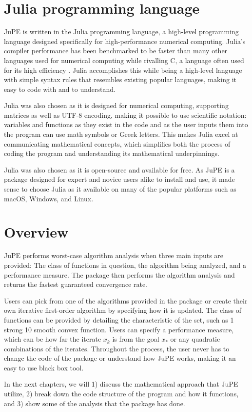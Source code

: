 \section{Julia programming language}

JuPE is written in the Julia programming language, a high-level programming language designed specifically for high-performance numerical computing. Julia's compiler performance has been benchmarked to be faster than many other languages used for numerical computing while rivalling C, a language often used for its high efficiency \cite{julia}. Julia accomplishes this while being a high-level language with simple syntax rules that resembles existing popular languages, making it easy to code with and to understand.

Julia was also chosen as it is designed for numerical computing, supporting matrices as well as UTF-8 encoding, making it possible to use scientific notation: variables and functions as they exist in the code and as the user inputs them into the program can use math symbols or Greek letters. This makes Julia excel at communicating mathematical concepts, which simplifies both the process of coding the program and understanding its mathematical underpinnings.

Julia was also chosen as it is open-source and available for free. As JuPE is a package designed for expert and novice users alike to install and use, it made sense to choose Julia as it available on many of the popular platforms such as macOS, Windows, and Linux.

\section{Overview}

JuPE performs worst-case algorithm analysis when three main inputs are provided: The class of functions in question, the algorithm being analyzed, and a performance measure. The package then performs the algorithm analysis and returns the fastest guaranteed convergence rate.

Users can pick from one of the algorithms provided in the package or create their own iterative first-order algorithm by specifying how it is updated. The class of functions can be provided by detailing the characteristic of the set, such as 1 strong 10 smooth convex function. Users can specify a performance measure, which can be how far the iterate \(x_k\) is from the goal \(x_*\) or any quadratic combinations of the iterates. Throughout the process, the user never has to change the code of the package or understand how JuPE works, making it an easy to use black box tool.

In the next chapters, we will 1) discuss the mathematical approach that JuPE utilize, 2) break down the code structure of the program and how it functions, and 3) show some of the analysis that the package has done.
